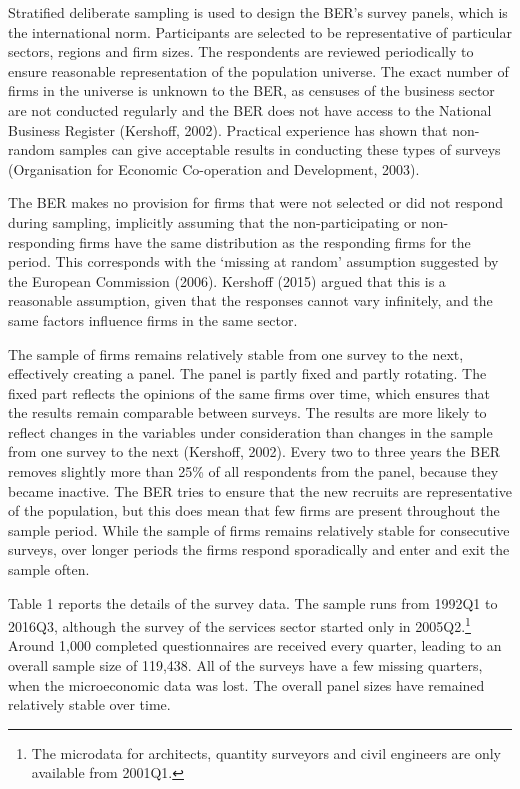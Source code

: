 \documentclass[11pt,]{article}
\let\rmarkdownfootnote\footnote%
\def\footnote{\protect\rmarkdownfootnote}
\begin{document}
Stratified deliberate sampling is used to design the BER's survey
panels, which is the international norm. Participants are selected to be
representative of particular sectors, regions and firm sizes. The
respondents are reviewed periodically to ensure reasonable
representation of the population universe. The exact number of firms in
the universe is unknown to the BER, as censuses of the business sector
are not conducted regularly and the BER does not have access to the
National Business Register (Kershoff, 2002). Practical experience has
shown that non-random samples can give acceptable results in conducting
these types of surveys (Organisation for Economic Co-operation and
Development, 2003).

The BER makes no provision for firms that were not selected or did not
respond during sampling, implicitly assuming that the non-participating
or non-responding firms have the same distribution as the responding
firms for the period. This corresponds with the `missing at random'
assumption suggested by the European Commission (2006). Kershoff (2015)
argued that this is a reasonable assumption, given that the responses
cannot vary infinitely, and the same factors influence firms in the same
sector.

The sample of firms remains relatively stable from one survey to the
next, effectively creating a panel. The panel is partly fixed and partly
rotating. The fixed part reflects the opinions of the same firms over
time, which ensures that the results remain comparable between surveys.
The results are more likely to reflect changes in the variables under
consideration than changes in the sample from one survey to the next
(Kershoff, 2002). Every two to three years the BER removes slightly more
than 25\% of all respondents from the panel, because they became
inactive. The BER tries to ensure that the new recruits are
representative of the population, but this does mean that few firms are
present throughout the sample period. While the sample of firms remains
relatively stable for consecutive surveys, over longer periods the firms
respond sporadically and enter and exit the sample often.

Table 1 reports the details of the survey data. The sample runs from
1992Q1 to 2016Q3, although the survey of the services sector started
only in 2005Q2.\footnote{The microdata for architects, quantity
  surveyors and civil engineers are only available from 2001Q1.} Around
1,000 completed questionnaires are received every quarter, leading to an
overall sample size of 119,438. All of the surveys have a few missing
quarters, when the microeconomic data was lost. The overall panel sizes
have remained relatively stable over time.
\end{document}
